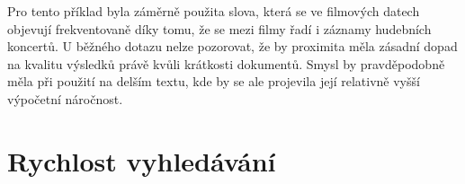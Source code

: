 \documentclass[11pt,letterpaper,oneside,openright]{book}
\begin{document}
Pro tento příklad byla záměrně použita slova, která se ve filmových datech
objevují frekventovaně díky tomu, že se mezi filmy řadí i záznamy hudebních
koncertů. U běžného dotazu nelze pozorovat, že by proximita měla zásadní dopad
na kvalitu výsledků právě kvůli krátkosti dokumentů. Smysl by pravděpodobně
měla při použití na delším textu, kde by se ale projevila její relativně vyšší
výpočetní náročnost.


\mbox{}\mbox{}

\mbox{}\mbox{}



\clearpage
\section{Rychlost vyhledávání} \label{sec:rychlost_vyhledavani}

\end{document}
